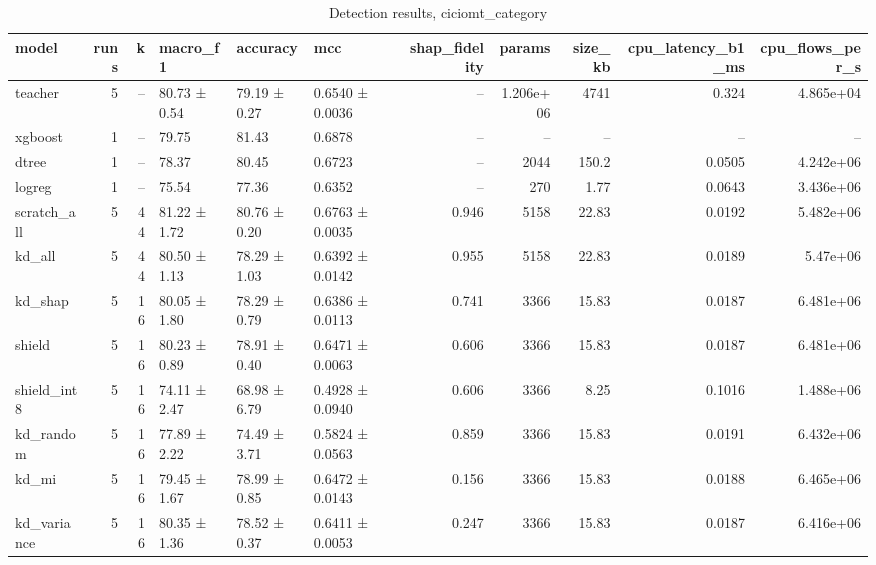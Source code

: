 \begin{table}
\caption{Detection results, ciciomt_category}
\begin{tabular}{lrrlllrrrrr}
\toprule
model & runs & k & macro_f1 & accuracy & mcc & shap_fidelity & params & size_kb & cpu_latency_b1_ms & cpu_flows_per_s \\
\midrule
teacher & 5 & -- & 80.73 ± 0.54 & 79.19 ± 0.27 & 0.6540 ± 0.0036 & -- & 1.206e+06 & 4741 & 0.324 & 4.865e+04 \\
xgboost & 1 & -- & 79.75 & 81.43 & 0.6878 & -- & -- & -- & -- & -- \\
dtree & 1 & -- & 78.37 & 80.45 & 0.6723 & -- & 2044 & 150.2 & 0.0505 & 4.242e+06 \\
logreg & 1 & -- & 75.54 & 77.36 & 0.6352 & -- & 270 & 1.77 & 0.0643 & 3.436e+06 \\
scratch_all & 5 & 44 & 81.22 ± 1.72 & 80.76 ± 0.20 & 0.6763 ± 0.0035 & 0.946 & 5158 & 22.83 & 0.0192 & 5.482e+06 \\
kd_all & 5 & 44 & 80.50 ± 1.13 & 78.29 ± 1.03 & 0.6392 ± 0.0142 & 0.955 & 5158 & 22.83 & 0.0189 & 5.47e+06 \\
kd_shap & 5 & 16 & 80.05 ± 1.80 & 78.29 ± 0.79 & 0.6386 ± 0.0113 & 0.741 & 3366 & 15.83 & 0.0187 & 6.481e+06 \\
shield & 5 & 16 & 80.23 ± 0.89 & 78.91 ± 0.40 & 0.6471 ± 0.0063 & 0.606 & 3366 & 15.83 & 0.0187 & 6.481e+06 \\
shield_int8 & 5 & 16 & 74.11 ± 2.47 & 68.98 ± 6.79 & 0.4928 ± 0.0940 & 0.606 & 3366 & 8.25 & 0.1016 & 1.488e+06 \\
kd_random & 5 & 16 & 77.89 ± 2.22 & 74.49 ± 3.71 & 0.5824 ± 0.0563 & 0.859 & 3366 & 15.83 & 0.0191 & 6.432e+06 \\
kd_mi & 5 & 16 & 79.45 ± 1.67 & 78.99 ± 0.85 & 0.6472 ± 0.0143 & 0.156 & 3366 & 15.83 & 0.0188 & 6.465e+06 \\
kd_variance & 5 & 16 & 80.35 ± 1.36 & 78.52 ± 0.37 & 0.6411 ± 0.0053 & 0.247 & 3366 & 15.83 & 0.0187 & 6.416e+06 \\
\bottomrule
\end{tabular}
\end{table}

